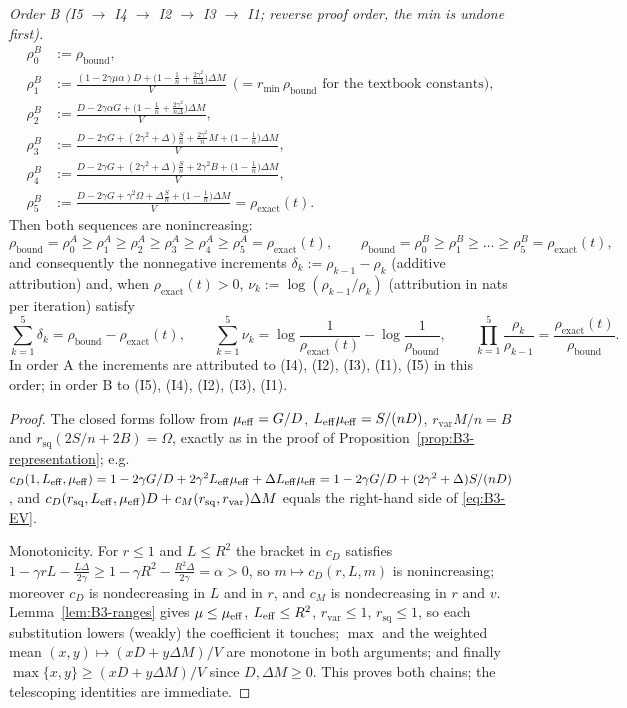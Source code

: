 \begin{proposition}
\emph{Order B (I5 $\to$ I4 $\to$ I2 $\to$ I3 $\to$ I1; reverse proof order, the min is undone first).}
\begin{align*}
\rho^{B}_0&:=\rho_{\mathrm{bound}},\\
\rho^{B}_1&:=\frac{(1-2\gamma\mu\alpha)D+\big(1-\frac1n+\frac{2\gamma^2}{n\Delta}\big)\Delta M}{V}
\ \ \big(=r_{\min}\,\rho_{\mathrm{bound}}\text{ for the textbook constants}\big),\\
\rho^{B}_2&:=\frac{D-2\gamma\alpha G+\big(1-\frac1n+\frac{2\gamma^2}{n\Delta}\big)\Delta M}{V},\\
\rho^{B}_3&:=\frac{D-2\gamma G+(2\gamma^2+\Delta)\frac Sn+\frac{2\gamma^2}{n}M+\big(1-\frac1n\big)\Delta M}{V},\\
\rho^{B}_4&:=\frac{D-2\gamma G+(2\gamma^2+\Delta)\frac Sn+2\gamma^2B+\big(1-\frac1n\big)\Delta M}{V},\\
\rho^{B}_5&:=\frac{D-2\gamma G+\gamma^2\Omega+\Delta\frac Sn+\big(1-\frac1n\big)\Delta M}{V}=\rho_{\mathrm{exact}}(t).
\end{align*}
Then both sequences are nonincreasing:
\[
\rho_{\mathrm{bound}}=\rho^{A}_0\ge\rho^{A}_1\ge\rho^{A}_2\ge\rho^{A}_3\ge\rho^{A}_4\ge\rho^{A}_5=\rho_{\mathrm{exact}}(t),\qquad
\rho_{\mathrm{bound}}=\rho^{B}_0\ge\rho^{B}_1\ge\dots\ge\rho^{B}_5=\rho_{\mathrm{exact}}(t),
\]
and consequently the nonnegative increments $\delta_k:=\rho_{k-1}-\rho_k$ (additive attribution) and, when $\rho_{\mathrm{exact}}(t)>0$, $\nu_k:=\log(\rho_{k-1}/\rho_k)$ (attribution in nats per iteration) satisfy
\[
\sum_{k=1}^5\delta_k=\rho_{\mathrm{bound}}-\rho_{\mathrm{exact}}(t),\qquad
\sum_{k=1}^5\nu_k=\log\frac1{\rho_{\mathrm{exact}}(t)}-\log\frac1{\rho_{\mathrm{bound}}},\qquad
\prod_{k=1}^5\frac{\rho_k}{\rho_{k-1}}=\frac{\rho_{\mathrm{exact}}(t)}{\rho_{\mathrm{bound}}}.
\]
In order A the increments are attributed to (I4), (I2), (I3), (I1), (I5) in this order; in order B to (I5), (I4), (I2), (I3), (I1).
\end{proposition}
\begin{proof}
The closed forms follow from $\mu_{\mathrm{eff}}=G/D$, $L_{\mathrm{eff}}\mu_{\mathrm{eff}}=S/(nD)$, $r_{\mathrm{var}}M/n=B$ and $r_{\mathrm{sq}}(2S/n+2B)=\Omega$, exactly as in the proof of Proposition~\ref{prop:B3-representation}; e.g.\ $c_D(1,L_{\mathrm{eff}},\mu_{\mathrm{eff}})=1-2\gamma G/D+2\gamma^2L_{\mathrm{eff}}\mu_{\mathrm{eff}}+\Delta L_{\mathrm{eff}}\mu_{\mathrm{eff}}=1-2\gamma G/D+(2\gamma^2+\Delta)S/(nD)$, and $c_D(r_{\mathrm{sq}},L_{\mathrm{eff}},\mu_{\mathrm{eff}})D+c_M(r_{\mathrm{sq}},r_{\mathrm{var}})\Delta M$ equals the right-hand side of \eqref{eq:B3-EV}.

Monotonicity. For $r\le1$ and $L\le R^2$ the bracket in $c_D$ satisfies $1-\gamma rL-\frac{L\Delta}{2\gamma}\ge1-\gamma R^2-\frac{R^2\Delta}{2\gamma}=\alpha>0$, so $m\mapsto c_D(r,L,m)$ is nonincreasing; moreover $c_D$ is nondecreasing in $L$ and in $r$, and $c_M$ is nondecreasing in $r$ and $v$. Lemma~\ref{lem:B3-ranges} gives $\mu\le\mu_{\mathrm{eff}}$, $L_{\mathrm{eff}}\le R^2$, $r_{\mathrm{var}}\le1$, $r_{\mathrm{sq}}\le1$, so each substitution lowers (weakly) the coefficient it touches; $\max$ and the weighted mean $(x,y)\mapsto(xD+y\Delta M)/V$ are monotone in both arguments; and finally $\max\{x,y\}\ge(xD+y\Delta M)/V$ since $D,\Delta M\ge0$. This proves both chains; the telescoping identities are immediate.
\end{proof}

